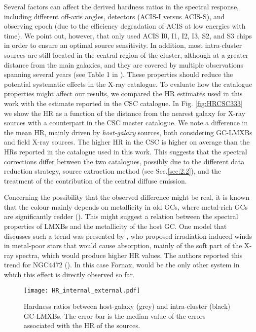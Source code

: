 \documentclass{aa}
\begin{document}
Several factors can affect the derived hardness ratios in the spectral response, including different off-axis angles, detectors (ACIS-I versus ACIS-S), and observing epoch (due to the efficiency degradation of ACIS at low energies with time). We point out, however, that \cite{Jin2019} only used ACIS I0, I1, I2, I3, S2, and S3 chips in order to ensure an optimal source sensitivity. In addition, most intra-cluster sources are still located in the central region of the cluster, although at a greater distance from the main galaxies, and they are covered by multiple observations  spanning several years (see Table 1 in \citealt{Jin2019}). These properties should reduce the potential systematic effects in the X-ray catalogue. To evaluate how the catalogue properties might affect our results, we compared the HR estimates used in this work with the estimate reported in the CSC  catalogue. In Fig. \ref{fig:HRCSC333} we show the HR as a function of the distance from the nearest galaxy for X-ray sources with a counterpart in the CSC master catalogue. We note a difference in the mean HR, mainly driven by {\it host-galaxy} sources, both considering GC-LMXBs and field X-ray sources. The higher HR in the CSC is higher on average than the HRs reported in the catalogue used in this work. This suggests that the spectral corrections differ between the two catalogues, possibly due to the different data reduction strategy, source extraction method (see Sec.\ref{sec:2.2}), and the treatment of the contribution of the central diffuse emission. 


Concerning the possibility that the observed difference might be real, it is known that the colour mainly depends on metallicity in old GCs, where metal-rich GCs are significantly redder (\citealt{Cantiello2018}). This might suggest a relation between the spectral properties of LMXBs and the metallicity of the host GC. One model that discusses such a trend was presented by \cite{Maccarone2004}, who proposed irradiation-induced winds in metal-poor stars that would cause absorption, mainly of the soft part of the X-ray spectra, which would produce higher HR values. The authors reported this trend for NGC4472 (\citealt{Maccarone2003}). In this case Fornax, would be the only other system in which this effect is directly observed so far. %



\begin{figure}[]
    \centering
    
    \texttt{[image: HR\_internal\_external.pdf]}
    \caption{Hardness ratios between host-galaxy (grey) and intra-cluster (black) GC-LMXBs. The error bar is the median value of the errors associated with the HR of the sources.} 
    \label{fig:HR}
\end{figure}
\end{document}
